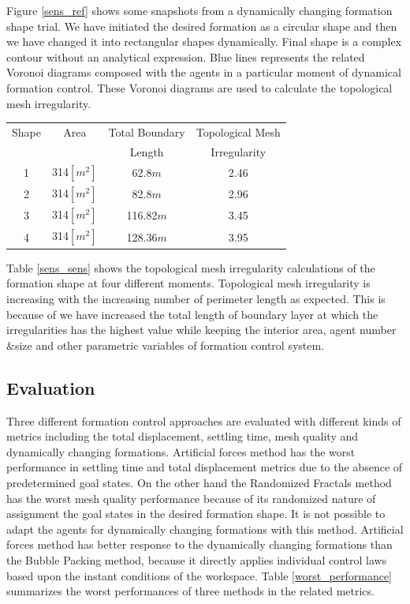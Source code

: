 Figure \ref{sens_ref} shows some snapshots from a dynamically changing formation shape trial. We have initiated the desired formation as a circular shape and then we have changed it into rectangular shapes dynamically. Final shape is a complex contour without an analytical expression. Blue lines represents the related Voronoi diagrams composed with the agents in a particular moment of dynamical formation control. These Voronoi diagrams are used to calculate the topological mesh irregularity. 

\begin{center}
 \label{sens_sens} 
\begin{tabular}{||c| c| c | c||}
				
\hline
Shape & Area  & Total Boundary & Topological Mesh\\ 
   &  & Length & Irregularity\\
\hline
1 & 314$[m^2]$ & 62.8$m$ & 2.46 \\
2 & 314$[m^2]$ & 82.8$m$ & 2.96 \\
3 & 314$[m^2]$ & 116.82$m$ & 3.45 \\
4 & 314$[m^2]$ & 128.36$m$ & 3.95 \\
\hline
\end{tabular}
\end{center}

Table \ref{sens_sens} shows the topological mesh irregularity calculations of the formation shape at four different moments. Topological mesh irregularity is increasing with the increasing number of perimeter length as expected. This is because of we have increased the total length of boundary layer at which the irregularities has the highest value while keeping the interior area, agent number$\&$size and other parametric variables of formation control system. 
\subsection{Evaluation} \label{evaluation_ref}
Three different formation control approaches are evaluated with different kinds of metrics including the total displacement, settling time, mesh quality and dynamically changing formations. Artificial forces method has the worst performance in settling time and total displacement metrics due to the absence of predetermined goal states. On the other hand the Randomized Fractals method has the worst mesh quality performance because of its randomized nature of assignment the goal states in the desired formation shape. It is not possible to adapt the agents for dynamically changing formations with this method. Artificial forces method has better response to the dynamically changing formations than the Bubble Packing method, because it directly applies individual control laws based upon the instant conditions of the workspace. Table \ref{worst_performance} summarizes the worst performances of three methods in the related metrics.
		

